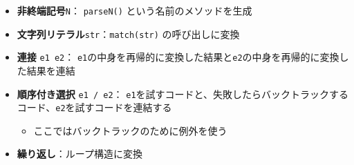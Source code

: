 \begin{itemize}
\tightlist
\item
  \textbf{非終端記号}\texttt{N}： \texttt{parseN()}
  という名前のメソッドを生成
\item
  \textbf{文字列リテラル}\texttt{str}：\texttt{match(str)}
  の呼び出しに変換
\item
  \textbf{連接} \texttt{e1\ e2}：
  \texttt{e1}の中身を再帰的に変換した結果と\texttt{e2}の中身を再帰的に変換した結果を連結
\item
  \textbf{順序付き選択} \texttt{e1\ /\ e2}：
  \texttt{e1}を試すコードと、失敗したらバックトラックするコード、\texttt{e2}を試すコードを連結する

  \begin{itemize}
  \tightlist
  \item
    ここではバックトラックのために例外を使う
  \end{itemize}
\item
  \textbf{繰り返し}：ループ構造に変換
\end{itemize}

